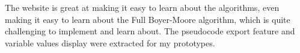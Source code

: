 The website is great at making it easy to learn about the algorithms, even making it easy to learn about the Full Boyer-Moore algorithm, which is quite challenging to implement and learn about. The pseudocode export feature and variable values display were extracted for my prototypes.


% 











